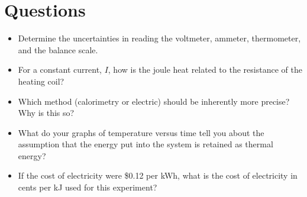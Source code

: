 \section{Questions}
\begin{itemize}
	\item Determine the uncertainties in reading the voltmeter, ammeter, thermometer, and the balance scale.
	\item For a constant current, $I$, how is the joule heat related to the resistance of the heating coil?
	\item Which method (calorimetry or electric) should be inherently more precise?  Why is this so?
	\item What do your graphs of temperature versus time tell you about the assumption that the energy put into the system is retained as thermal energy?
	\item If the cost of electricity were \$0.12 per kWh, what is the cost of electricity in cents per kJ used for this experiment?
\end{itemize}

\endinput
